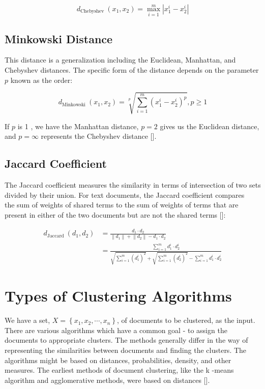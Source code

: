 \begin{equation*}
d_{\text {Chebyshev }}\left(x_{1}, x_{2}\right)=\max _{i=1}^{m}\left|x_{1}^{i}-x_{2}^{i}\right| \tag{12.9}
\end{equation*}

\subsection{Minkowski Distance}
This distance is a generalization including the Euclidean, Manhattan, and Chebyshev distances. The specific form of the distance depends on the parameter $p$ known as the order:


\begin{equation*}
d_{\text {Minkowski }}\left(x_{1}, x_{2}\right)=\sqrt[p]{\sum_{i=1}^{m}\left(x_{1}^{i}-x_{2}^{i}\right)^{p}}, p \geq 1 \tag{12.10}
\end{equation*}


If $p$ is 1 , we have the Manhattan distance, $p=2$ gives us the Euclidean distance, and $p=\infty$ represents the Chebyshev distance [\cite{ref16}].

\subsection{Jaccard Coefficient}
The Jaccard coefficient measures the similarity in terms of intersection of two sets divided by their union. For text documents, the Jaccard coefficient compares\\[0pt]
the sum of weights of shared terms to the sum of weights of terms that are present in either of the two documents but are not the shared terms [\cite{ref120}]:


\begin{align*}
d_{\text {Jaccard }}\left(d_{1}, d_{2}\right) & =\frac{d_{1} \cdot d_{2}}{\left\|d_{1}\right\|+\left\|d_{2}\right\|-d_{1} \cdot d_{2}} \\
& =\frac{\sum_{i=1}^{m} d_{1}^{i} \cdot d_{2}^{i}}{\sqrt{\sum_{i=1}^{m}\left(d_{1}^{i}\right)^{2}}+\sqrt{\sum_{i=1}^{m}\left(d_{2}^{i}\right)^{2}}-\sum_{i=1}^{m} d_{1}^{i} \cdot d_{2}^{i}} \tag{12.11}
\end{align*}

\section{Types of Clustering Algorithms}
We have a set, $X=\left\{x_{1}, x_{2}, \cdots, x_{n}\right\}$, of documents to be clustered, as the input. There are various algorithms which have a common goal - to assign the documents to appropriate clusters. The methods generally differ in the way of representing the similarities between documents and finding the clusters. The algorithms might be based on distances, probabilities, density, and other measures. The earliest methods of document clustering, like the k -means algorithm and agglomerative methods, were based on distances [\cite{ref5}].

